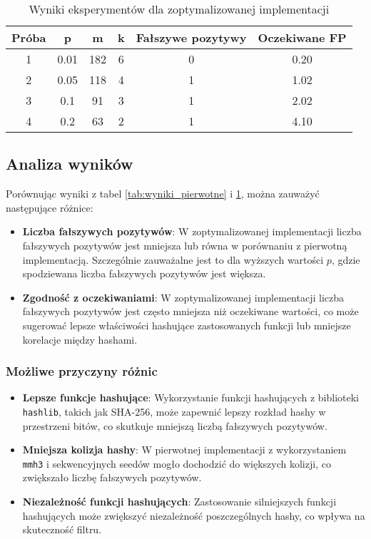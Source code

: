 \documentclass{article}
\begin{document}
\begin{table}[H]
\centering
\begin{tabular}{cccccc}
\toprule
\textbf{Próba} & \textbf{p} & \textbf{m} & \textbf{k} & \textbf{Fałszywe pozytywy} & \textbf{Oczekiwane FP} \\
\midrule
1 & 0.01 & 182 & 6 & 0 & 0.20 \\
2 & 0.05 & 118 & 4 & 1 & 1.02 \\
3 & 0.1 & 91 & 3 & 1 & 2.02 \\
4 & 0.2 & 63 & 2 & 1 & 4.10 \\
\bottomrule
\end{tabular}
\caption{Wyniki eksperymentów dla zoptymalizowanej implementacji}
\label{tab:wyniki_zoptymalizowane}
\end{table}

\newpage

\subsection{Analiza wyników}

Porównując wyniki z tabel \ref{tab:wyniki_pierwotne} i \ref{tab:wyniki_zoptymalizowane}, można zauważyć następujące różnice:

\begin{itemize}
    \item \textbf{Liczba fałszywych pozytywów}: W zoptymalizowanej implementacji liczba fałszywych pozytywów jest mniejsza lub równa w porównaniu z pierwotną implementacją. Szczególnie zauważalne jest to dla wyższych wartości $p$, gdzie spodziewana liczba fałszywych pozytywów jest większa.
    
    \item \textbf{Zgodność z oczekiwaniami}: W zoptymalizowanej implementacji liczba fałszywych pozytywów jest często mniejsza niż oczekiwane wartości, co może sugerować lepsze właściwości hashujące zastosowanych funkcji lub mniejsze korelacje między hashami.
\end{itemize}

\subsubsection{Możliwe przyczyny różnic}

\begin{itemize}
    \item \textbf{Lepsze funkcje hashujące}: Wykorzystanie funkcji hashujących z biblioteki \texttt{hashlib}, takich jak SHA-256, może zapewnić lepszy rozkład hashy w przestrzeni bitów, co skutkuje mniejszą liczbą fałszywych pozytywów.
    \item \textbf{Mniejsza kolizja hashy}: W pierwotnej implementacji z wykorzystaniem \texttt{mmh3} i sekwencyjnych seedów mogło dochodzić do większych kolizji, co zwiększało liczbę fałszywych pozytywów.
    \item \textbf{Niezależność funkcji hashujących}: Zastosowanie silniejszych funkcji hashujących może zwiększyć niezależność poszczególnych hashy, co wpływa na skuteczność filtru.
\end{itemize}
\end{document}

